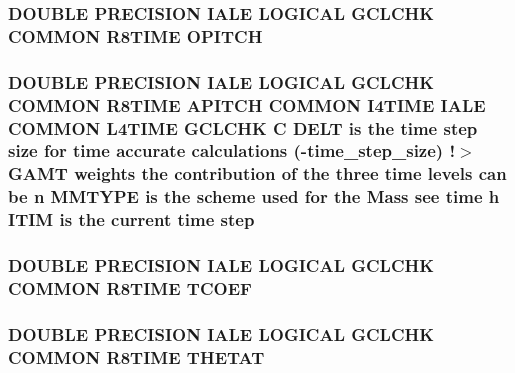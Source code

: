 \hypertarget{time_8com_a00fbf27574a9140219cb0fadfbdf5576}{
\subsubsection[{O\-P\-I\-T\-C\-H}]{\setlength{\rightskip}{0pt plus 5cm}D\-O\-U\-B\-L\-E P\-R\-E\-C\-I\-S\-I\-O\-N I\-A\-L\-E L\-O\-G\-I\-C\-A\-L G\-C\-L\-C\-H\-K C\-O\-M\-M\-O\-N R8\-T\-I\-M\-E O\-P\-I\-T\-C\-H}}\label{time_8com_a00fbf27574a9140219cb0fadfbdf5576}
\hypertarget{time_8com_a91e550adb29e949f38f0252aa68aceed}{
\subsubsection[{step}]{\setlength{\rightskip}{0pt plus 5cm}D\-O\-U\-B\-L\-E P\-R\-E\-C\-I\-S\-I\-O\-N I\-A\-L\-E L\-O\-G\-I\-C\-A\-L G\-C\-L\-C\-H\-K C\-O\-M\-M\-O\-N R8\-T\-I\-M\-E {\bf A\-P\-I\-T\-C\-H} C\-O\-M\-M\-O\-N I4\-T\-I\-M\-E I\-A\-L\-E C\-O\-M\-M\-O\-N L4\-T\-I\-M\-E G\-C\-L\-C\-H\-K C {\bf D\-E\-L\-T} is the time step size for time accurate calculations (-\/time\-\_\-step\-\_\-size) !$>$ {\bf G\-A\-M\-T} weights the contribution of the three time levels can be {\bf n} {\bf M\-M\-T\-Y\-P\-E} is the scheme {\bf used} for the Mass see time h {\bf I\-T\-I\-M} is the current time step}}\label{time_8com_a91e550adb29e949f38f0252aa68aceed}
\hypertarget{time_8com_a16f51598c500f622ff8f3d7810f8e3ad}{
\subsubsection[{T\-C\-O\-E\-F}]{\setlength{\rightskip}{0pt plus 5cm}D\-O\-U\-B\-L\-E P\-R\-E\-C\-I\-S\-I\-O\-N I\-A\-L\-E L\-O\-G\-I\-C\-A\-L G\-C\-L\-C\-H\-K C\-O\-M\-M\-O\-N R8\-T\-I\-M\-E T\-C\-O\-E\-F}}\label{time_8com_a16f51598c500f622ff8f3d7810f8e3ad}
\hypertarget{time_8com_a0752af9342b68501fff493175f88f86e}{
\subsubsection[{T\-H\-E\-T\-A\-T}]{\setlength{\rightskip}{0pt plus 5cm}D\-O\-U\-B\-L\-E P\-R\-E\-C\-I\-S\-I\-O\-N I\-A\-L\-E L\-O\-G\-I\-C\-A\-L G\-C\-L\-C\-H\-K C\-O\-M\-M\-O\-N R8\-T\-I\-M\-E T\-H\-E\-T\-A\-T}}\label{time_8com_a0752af9342b68501fff493175f88f86e}
